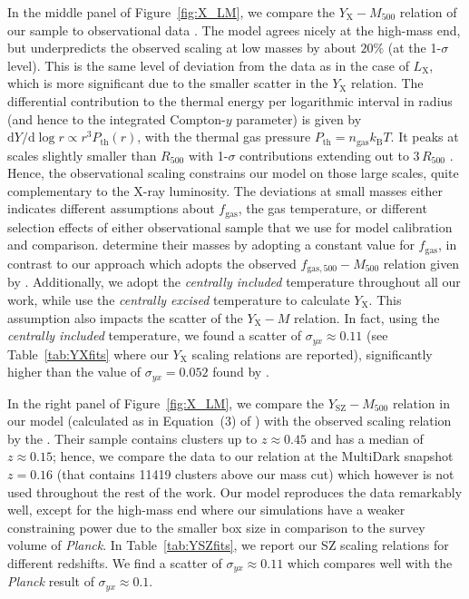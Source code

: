 \documentclass[traditabstract]{aa}
\newcommand{\rmn}{\mathrm}
\newcommand{\dd}{\mathrm{d}}
\begin{document}
In the middle panel of Figure~\ref{fig:X_LM}, we compare the
$Y_{\rmn{X}}-M_{500}$ relation of our sample to observational data
\citep{2010MNRAS.406.1773M}. The model agrees nicely at the high-mass end, but
underpredicts the observed scaling at low masses by about $20\%$ (at the
1-$\sigma$ level). This is the same level of deviation from the data as in the
case of $L_{\rmn{X}}$, which is more significant due to the smaller scatter in
the $Y_{\rmn{X}}$ relation. The differential contribution to the thermal energy
per logarithmic interval in radius (and hence to the integrated Compton-$y$
parameter) is given by $\dd Y /\dd\log r \propto r^3 P_{\rmn{th}}(r)$, with the
thermal gas pressure $P_{\rmn{th}}=n_{\rmn{gas}}k_{\rmn{B}}T$. It peaks at
scales slightly smaller than $R_{500}$ with 1-$\sigma$ contributions extending
out to $3\,R_{500}$ \citep{2010ApJ...725...91B}. Hence, the observational
scaling constrains our model on those large scales, quite complementary to the
X-ray luminosity. The deviations at small masses either indicates different
assumptions about $f_{\rmn{gas}}$, the gas temperature, or different selection
effects of either observational sample that we use for model calibration and
comparison.  \cite{2010MNRAS.406.1773M} determine their masses by adopting a
constant value for $f_{\rmn{gas}}$, in contrast to our approach which adopts the
observed $f_{\rmn{gas},500}-M_{500}$ relation given by
\cite{2009ApJ...693.1142S}. Additionally, we adopt the
\cite{2010MNRAS.406.1773M} \emph{centrally included} temperature throughout all
our work, while \cite{2010MNRAS.406.1773M} use the \emph{centrally excised}
temperature to calculate $Y_{\rmn{X}}$. This assumption also impacts the scatter
of the $Y_{\rmn{X}}-M$ relation. In fact, using the \emph{centrally included}
temperature, we found a scatter of $\sigma_{yx} \approx 0.11$ (see
Table~\ref{tab:YXfits} where our $Y_{\rmn{X}}$ scaling relations are reported),
significantly higher than the value of $\sigma_{yx} = 0.052$ found by
\cite{2010MNRAS.406.1773M}.

In the right panel of Figure~\ref{fig:X_LM}, we compare the
$Y_{\rmn{SZ}}-M_{500}$ relation in our model (calculated as in Equation~(3) of
\citealp{2011arXiv1109.3709B}) with the observed scaling relation by the
\cite{2011A&A...536A..11P}. Their sample contains clusters up to $z \approx
0.45$ and has a median of $z \approx 0.15$; hence, we compare the data to our
relation at the MultiDark snapshot $z=0.16$ (that contains 11419 clusters above
our mass cut) which however is not used throughout the rest of the work. Our
model reproduces the data remarkably well, except for the high-mass end where
our simulations have a weaker constraining power due to the smaller box size in
comparison to the survey volume of {\em Planck}. In Table~\ref{tab:YSZfits}, we
report our SZ scaling relations for different redshifts. We find a scatter of
$\sigma_{yx} \approx 0.11$ which compares well with the \emph{Planck} result of
$\sigma_{yx} \approx 0.1$.
 
\end{document}
